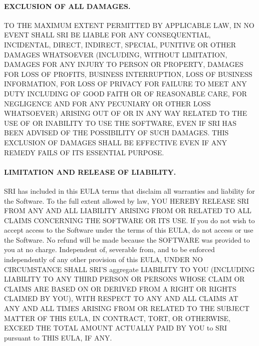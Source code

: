 \documentclass[11pt,twoside,fleqn,openright,titlepage]{cslreport}
\begin{document}
\begin{small}
\paragraph{EXCLUSION  OF  ALL  DAMAGES.}   TO  THE  MAXIMUM  EXTENT
PERMITTED BY APPLICABLE LAW, IN NO EVENT SHALL SRI BE LIABLE FOR ANY
CONSEQUENTIAL, INCIDENTAL, DIRECT, INDIRECT, SPECIAL, PUNITIVE OR
OTHER DAMAGES WHATSOEVER (INCLUDING, WITHOUT LIMITATION, DAMAGES FOR
ANY INJURY TO PERSON OR PROPERTY, DAMAGES FOR LOSS OF PROFITS,
BUSINESS INTERRUPTION, LOSS OF BUSINESS INFORMATION, FOR LOSS OF
PRIVACY FOR FAILURE TO MEET ANY DUTY INCLUDING OF GOOD FAITH OR OF
REASONABLE CARE, FOR NEGLIGENCE AND FOR ANY PECUNIARY OR OTHER LOSS
WHATSOEVER) ARISING OUT OF OR IN ANY WAY RELATED TO THE USE OF OR
INABILITY TO USE THE SOFTWARE, EVEN IF SRI HAS BEEN ADVISED OF THE
POSSIBILITY OF SUCH DAMAGES.  THIS EXCLUSION OF DAMAGES SHALL BE
EFFECTIVE EVEN IF ANY REMEDY FAILS OF ITS ESSENTIAL PURPOSE.

\paragraph{LIMITATION AND  RELEASE OF LIABILITY.}   SRI has included in
this EULA terms that disclaim all warranties and liability for the
Software.  To the full extent allowed by law, YOU HEREBY RELEASE SRI
FROM ANY AND ALL LIABILITY ARISING FROM OR RELATED TO ALL CLAIMS
CONCERNING THE SOFTWARE OR ITS USE.  If you do not wish to accept
access to the Software under the terms of this EULA, do not access or
use the Software.  No refund will be made because the SOFTWARE was
provided to you at no charge.  Independent of, severable from, and to
be enforced independently of any other provision of this EULA, UNDER
NO CIRCUMSTANCE SHALL SRI'S aggregate LIABILITY TO YOU (INCLUDING
LIABILITY TO ANY THIRD PERSON OR PERSONS WHOSE CLAIM OR CLAIMS ARE
BASED ON OR DERIVED FROM A RIGHT OR RIGHTS CLAIMED BY YOU), WITH
RESPECT TO ANY AND ALL CLAIMS AT ANY AND ALL TIMES ARISING FROM OR
RELATED TO THE SUBJECT MATTER OF THIS EULA, IN CONTRACT, TORT, OR
OTHERWISE, EXCEED THE TOTAL AMOUNT ACTUALLY PAID BY YOU to SRI
pursuant to THIS EULA, IF ANY.


\end{small}
\end{document}
